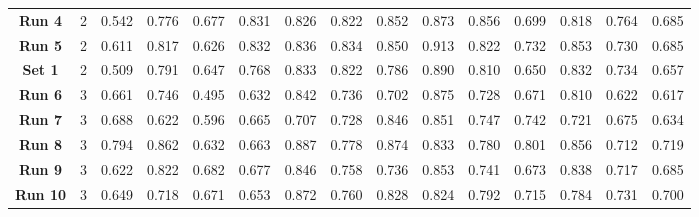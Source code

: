 \begin{table*}[!ht]
{\begin{tabular}{|c|c|ccc|ccc|ccc|c|c|c|c|}
			\textbf{Run 4} & 2 & \multicolumn{1}{c|}{0.542} & \multicolumn{1}{c|}{0.776} & 0.677 & \multicolumn{1}{c|}{0.831} & \multicolumn{1}{c|}{0.826} & 0.822 & \multicolumn{1}{c|}{0.852} & \multicolumn{1}{c|}{0.873} & 0.856 & 0.699 & 0.818 & 0.764 & 0.685 \\
			
			\textbf{Run 5} & 2 & \multicolumn{1}{c|}{0.611} & \multicolumn{1}{c|}{0.817} & 0.626 & \multicolumn{1}{c|}{0.832} & \multicolumn{1}{c|}{0.836} & 0.834 & \multicolumn{1}{c|}{0.850} & \multicolumn{1}{c|}{0.913} & 0.822 & 0.732 & 0.853 & 0.730 & 0.685 \\
			
			\hline
			
			\textbf{Set 1} & 2 & \multicolumn{1}{c|}{0.509} & \multicolumn{1}{c|}{0.791} & 0.647 & \multicolumn{1}{c|}{0.768} & \multicolumn{1}{c|}{0.833} & 0.822 & \multicolumn{1}{c|}{0.786} & \multicolumn{1}{c|}{0.890} & 0.810 & 0.650 & 0.832 & 0.734 & 0.657 \\
			
			\hline
			\hline
			
			\textbf{Run 6} & 3 & \multicolumn{1}{c|}{0.661} & \multicolumn{1}{c|}{0.746} & 0.495 & \multicolumn{1}{c|}{0.632} & \multicolumn{1}{c|}{0.842} & 0.736 & \multicolumn{1}{c|}{0.702} & \multicolumn{1}{c|}{0.875} & 0.728 & 0.671 & 0.810 & 0.622 & 0.617 \\
			
			\textbf{Run 7} & 3 & \multicolumn{1}{c|}{0.688} & \multicolumn{1}{c|}{0.622} & 0.596 & \multicolumn{1}{c|}{0.665} & \multicolumn{1}{c|}{0.707} & 0.728 & \multicolumn{1}{c|}{0.846} & \multicolumn{1}{c|}{0.851} & 0.747 & 0.742 & 0.721 & 0.675 & 0.634 \\
			
			\textbf{Run 8} & 3 & \multicolumn{1}{c|}{0.794} & \multicolumn{1}{c|}{0.862} & 0.632 & \multicolumn{1}{c|}{0.663} & \multicolumn{1}{c|}{0.887} & 0.778 & \multicolumn{1}{c|}{0.874} & \multicolumn{1}{c|}{0.833} & 0.780 & 0.801 & 0.856 & 0.712 & 0.719 \\
			
			\textbf{Run 9} & 3 & \multicolumn{1}{c|}{0.622} & \multicolumn{1}{c|}{0.822} & 0.682 & \multicolumn{1}{c|}{0.677} & \multicolumn{1}{c|}{0.846} & 0.758 & \multicolumn{1}{c|}{0.736} & \multicolumn{1}{c|}{0.853} & 0.741 & 0.673 & 0.838 & 0.717 & 0.685 \\
			
			\textbf{Run 10} & 3 & \multicolumn{1}{c|}{0.649} & \multicolumn{1}{c|}{0.718} & 0.671 & \multicolumn{1}{c|}{0.653} & \multicolumn{1}{c|}{0.872} & 0.760 & \multicolumn{1}{c|}{0.828} & \multicolumn{1}{c|}{0.824} & 0.792 & 0.715 & 0.784 & 0.731 & 0.700 \\
			

\end{tabular}}
\end{table*}
